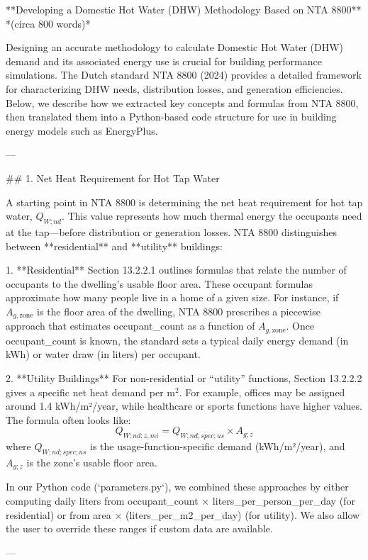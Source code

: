 **Developing a Domestic Hot Water (DHW) Methodology Based on NTA 8800**  
*(circa 800 words)*

Designing an accurate methodology to calculate Domestic Hot Water (DHW) demand and its associated energy use is crucial for building performance simulations. The Dutch standard NTA 8800 (2024) provides a detailed framework for characterizing DHW needs, distribution losses, and generation efficiencies. Below, we describe how we extracted key concepts and formulas from NTA 8800, then translated them into a Python-based code structure for use in building energy models such as EnergyPlus.

---

## 1. Net Heat Requirement for Hot Tap Water

A starting point in NTA 8800 is determining the net heat requirement for hot tap water, \( Q_{W;nd} \). This value represents how much thermal energy the occupants need at the tap—before distribution or generation losses. NTA 8800 distinguishes between **residential** and **utility** buildings:

1. **Residential**  
   Section 13.2.2.1 outlines formulas that relate the number of occupants to the dwelling’s usable floor area. These occupant formulas approximate how many people live in a home of a given size. For instance, if \(A_{g, \text{zone}}\) is the floor area of the dwelling, NTA 8800 prescribes a piecewise approach that estimates occupant_count as a function of \(A_{g, \text{zone}}\). Once occupant_count is known, the standard sets a typical daily energy demand (in kWh) or water draw (in liters) per occupant.

2. **Utility Buildings**  
   For non-residential or “utility” functions, Section 13.2.2.2 gives a specific net heat demand per \(\text{m}^2\). For example, offices may be assigned around 1.4 kWh/m²/year, while healthcare or sports functions have higher values. The formula often looks like:
   \[
   Q_{W;nd;z,mi} = Q_{W;nd;spec;us} \times A_{g;z}
   \]
   where \( Q_{W;nd;spec;us} \) is the usage-function-specific demand (kWh/m²/year), and \( A_{g;z} \) is the zone’s usable floor area.

In our Python code (`parameters.py`), we combined these approaches by either computing daily liters from occupant_count × liters_per_person_per_day (for residential) or from area × (liters_per_m2_per_day) (for utility). We also allow the user to override these ranges if custom data are available.

---

